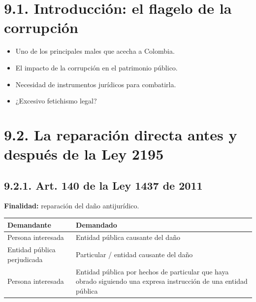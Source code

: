 
\section{9.1. Introducción: el flagelo de la corrupción}
\begin{itemize}
\item Uno de los principales males que acecha a Colombia.
\item El impacto de la corrupción en el patrimonio público.
\item Necesidad de instrumentos jurídicos para combatirla.
\item ¿Excesivo fetichismo legal?
\end{itemize}
\section{9.2. La reparación directa antes y después de la Ley 2195}
\subsection{9.2.1. Art. 140 de la Ley 1437 de 2011}
\textbf{Finalidad:} reparación del daño antijurídico.

\begin{tabla}
\begin{longtable}{|>{\raggedright\arraybackslash}m{}|>{\raggedright\arraybackslash}m{}|}
\hline
\cellcolor[HTML]{1F3864}\textcolor[HTML]{FFFFFF}{\textbf{Demandante}} & \cellcolor[HTML]{1F3864}\textcolor[HTML]{FFFFFF}{\textbf{Demandado}} \\ \hline
Persona interesada & Entidad pública causante del daño \\ \hline
\cellcolor[HTML]{F2F5FA}Entidad pública perjudicada & \cellcolor[HTML]{F2F5FA}Particular / entidad causante del daño \\ \hline
Persona interesada & Entidad pública por hechos de particular que haya obrado siguiendo una expresa instrucción de una entidad pública \\ \hline
\end{longtable}
\end{tabla}

